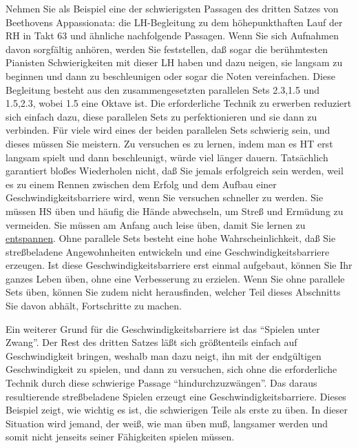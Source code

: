 Nehmen Sie als Beispiel eine der schwierigsten Passagen des dritten Satzes von Beethovens Appassionata: die LH-Begleitung zu dem höhepunkthaften Lauf der RH in Takt 63 und ähnliche nachfolgende Passagen.
Wenn Sie sich Aufnahmen davon sorgfältig anhören, werden Sie feststellen, daß sogar die berühmtesten Pianisten Schwierigkeiten mit dieser LH haben und dazu neigen, sie langsam zu beginnen und dann zu beschleunigen oder sogar die Noten vereinfachen.
Diese Begleitung besteht aus den zusammengesetzten parallelen Sets 2.3,1.5 und 1.5,2.3, wobei 1.5 eine Oktave ist.
Die erforderliche Technik zu erwerben reduziert sich einfach dazu, diese parallelen Sets zu perfektionieren und sie dann zu verbinden.
Für viele wird eines der beiden parallelen Sets schwierig sein, und dieses müssen Sie meistern.
Zu versuchen es zu lernen, indem man es HT erst langsam spielt und dann beschleunigt, würde viel länger dauern.
Tatsächlich garantiert bloßes Wiederholen nicht, daß Sie jemals erfolgreich sein werden, weil es zu einem Rennen zwischen dem Erfolg und dem Aufbau einer Geschwindigkeitsbarriere wird, wenn Sie versuchen schneller zu werden.
Sie müssen HS üben und häufig die Hände abwechseln, um Streß und Ermüdung zu vermeiden.
Sie müssen am Anfang auch leise üben, damit Sie lernen zu \hyperlink{c1ii14}{entspannen}.
Ohne parallele Sets besteht eine hohe Wahrscheinlichkeit, daß Sie streßbeladene Angewohnheiten entwickeln und eine Geschwindigkeitsbarriere erzeugen.
Ist diese Geschwindigkeitsbarriere erst einmal aufgebaut, können Sie Ihr ganzes Leben üben, ohne eine Verbesserung zu erzielen.
Wenn Sie ohne parallele Sets üben, können Sie zudem nicht herausfinden, welcher Teil dieses Abschnitts Sie davon abhält, Fortschritte zu machen.

Ein weiterer Grund für die Geschwindigkeitsbarriere ist das \enquote{Spielen unter Zwang}.
Der Rest des dritten Satzes läßt sich größtenteils einfach auf Geschwindigkeit bringen, weshalb man dazu neigt, ihn mit der endgültigen Geschwindigkeit zu spielen, und dann zu versuchen, sich ohne die erforderliche Technik durch diese schwierige Passage \enquote{hindurchzuzwängen}.
Das daraus resultierende streßbeladene Spielen erzeugt eine Geschwindigkeitsbarriere.
Dieses Beispiel zeigt, wie wichtig es ist, die schwierigen Teile als erste zu üben.
In dieser Situation wird jemand, der weiß, wie man üben muß, langsamer werden und somit nicht jenseits seiner Fähigkeiten spielen müssen.

